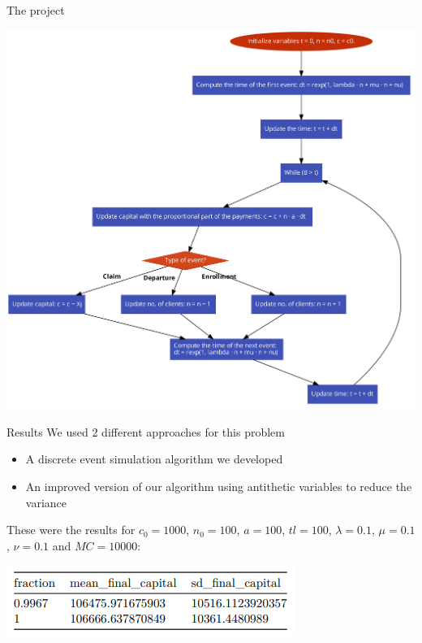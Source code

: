 \documentclass[
  ignorenonframetext,
]{beamer}
\begin{document}
\begin{frame}{The project}
\protect\hypertarget{the-project}{}
\begin{center}\includegraphics[width=0.7\linewidth]{flux} \end{center}
\end{frame}

\begin{frame}{Results}
\protect\hypertarget{results}{}
We used 2 different approaches for this problem

\begin{itemize}
\item A discrete event simulation algorithm we developed
\item An improved version of our algorithm using antithetic variables to reduce the variance
\end{itemize}

These were the results for \(c_0 = 1000\), \(n_0 = 100\), \(a = 100\),
\(tl = 100\), \(\lambda = 0.1\), \(\mu = 0.1\), \(\nu = 0.1\) and
\(MC = 10000\):

\begin{center}\includegraphics[width=0.8\linewidth]{results_table_comparison} \end{center}
\end{frame}
\end{document}
